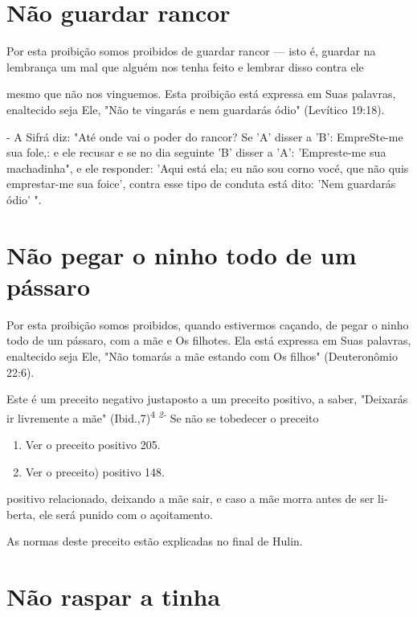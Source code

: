 \begin{itemize}
\begin{enumrate}
\begin{itemize}
\begin{itemize}
\begin{itemize}
\section{Não guardar rancor}

Por esta proibição somos proibidos de guardar rancor --- isto é,
guar­dar na lembrança um mal que alguém nos tenha feito e lembrar disso
contra ele

mesmo que não nos vinguemos. Esta proibição está expressa em Suas
pala­vras, enaltecido seja Ele, "Não te vingarás e nem guardarás ódio"
(Levítico 19:18).

- A Sifrá diz: "Até onde vai o poder do rancor? Se 'A' disser a 'B':
EmpreSte-me sua fole,: e ele recusar e se no dia seguinte 'B' disser a
'A': 'Em­preste-me sua machadinha", e ele responder: 'Aqui está ela; eu
não sou corno vocé, que não quis emprestar-me sua foice', contra esse
tipo de conduta está di­to: 'Nem guardarás ódio' ".

\section{Não pegar o ninho todo de um pássaro}

Por esta proibição somos proibidos, quando estivermos caçando, de pegar
o ninho todo de um pássaro, com a mãe e Os filhotes. Ela está expressa
em Suas palavras, enaltecido seja Ele, "Não tomarás a mãe estando com Os
fi­lhos" (Deuteronômio 22:6).

Este é um preceito negativo justaposto a um preceito positivo, a sa­ber,
"Deixarás ir livremente a mãe" (Ibid.,7)\textsuperscript{4 \emph{2-}} Se
não se tobedecer o preceito


\begin{enumerate}
\def\labelenumi{\arabic{enumi}.}
\setcounter{enumi}{425}
\item
 
 Ver o preceito positivo 205.
 
\item
 
 Ver o preceito) positivo 148.
 
\end{enumerate}


positivo relacionado, deixando a mãe sair, e caso a mãe morra antes de
ser li­berta, ele será punido com o açoitamento.

As normas deste preceito estão explicadas no final de Hulin.

\section{Não raspar a tinha}


\end{itemize}
\end{itemize}
\end{itemize}
\end{enumrate}
\end{itemize}
